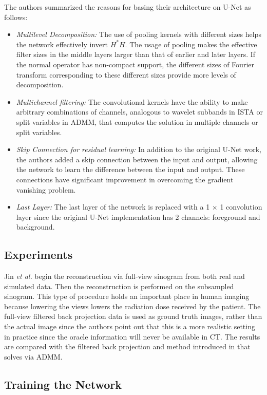 \documentclass[journal, onecolumn, 11pt]{IEEEtran}
\begin{document}
The authors summarized the reasons for basing their architecture on U-Net as follows: 
\begin{itemize}
    \item \textit{Multilevel Decomposition:} The use of pooling kernels with different sizes helps the network effectively invert $H^\ast H$. The usage of pooling makes the effective filter sizes in the middle layers larger than that of earlier and later layers. If the normal operator has non-compact support, the different sizes of Fourier transform corresponding to these different sizes provide more levels of decomposition.
    \item \textit{Multichannel filtering:} The convolutional kernels have the ability to make arbitrary combinations of channels, analogous to wavelet subbands in ISTA or split variables in ADMM, that computes the solution in multiple channels or split variables. 
    \item \textit{Skip Connection for residual learning:} In addition to the original U-Net work, the authors added a skip connection between the input and output, allowing the network to learn the difference between the input and output. These connections have significant improvement in overcoming the gradient vanishing problem. 
    \item \textit{Last Layer:} The last layer of the network is replaced with a 1 $\times$ 1 convolution layer since the original U-Net implementation has 2 channels: foreground and background. 
\end{itemize}

\subsection{Experiments}

Jin \textit{et al.} begin the reconstruction via full-view sinogram from both real and simulated data. Then the reconstruction is performed on the subsampled sinogram. This type of procedure holds an important place in human imaging because lowering the views lowers the radiation dose received by the patient. The full-view filtered back projection data is used as ground truth images, rather than the actual image since the authors point out that this is a more realistic setting in practice since the oracle information will never be available in CT. The results are compared with the filtered back projection and method introduced in \cite{TV} that solves  via ADMM. 

\subsection{Training the Network}
\end{document}
